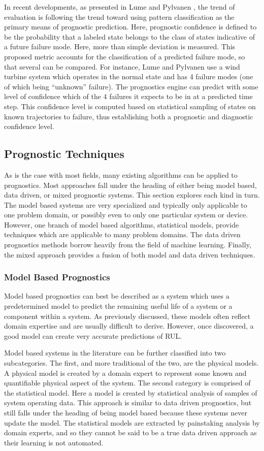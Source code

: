 \documentclass[12pt]{article}
\begin{document}
In recent developments, as presented in Lume and Pylvanen
\cite{6299510}, the trend of evaluation is following the trend toward
using pattern classification as the primary means of prognostic
prediction.  Here, prognostic confidence is defined to be the
probability that a labeled state belongs to the class of states
indicative of a future failure mode.  Here, more than simple deviation
is measured.  This proposed metric accounts for the classification of
a predicted failure mode, so that several can be compared.  For
instance, Lume and Pylvanen use a wind turbine system which operates
in the normal state and has 4 failure modes (one of which being
``unknown'' failure).  The prognostics engine can predict with some
level of confidence which of the 4 failures it expects to be in at a
predicted time step.  This confidence level is computed based on
statistical sampling of states on known trajectories to failure, thus
establishing both a prognostic and diagnostic confidence level.


\subsection{Prognostic Techniques}
As is the case with most fields, many existing algorithms can be
applied to prognostics.  Most approaches fall under the heading of
either being model based, data driven, or mixed prognostic systems.
This section explores each kind in turn. The model based systems are
very specialized and typically only applicable to one problem domain,
or possibly even to only one particular system or device.  However,
one branch of model based algorithms, statistical models, provide
techniques which are applicable to many problem domains.  The data
driven prognostics methods borrow heavily from the field of machine
learning.  Finally, the mixed approach provides a fusion of both model
and data driven techniques.

\subsubsection{Model Based Prognostics}
Model based prognostics can best be described as a system which uses a
predetermined model to predict the remaining useful life of a system
or a component within a system.  As previously discussed, these models
often reflect domain expertise and are usually difficult to derive.
However, once discovered, a good model can create very accurate
predictions of RUL.

Model based systems in the literature can be further classified into
two subcategories.  The first, and more traditional of the two, are
the physical models.  A physical model is created by a domain expert
to represent some known and quantifiable physical aspect of the
system. The second category is comprised of the statistical model.
Here a model is created by statistical analysis of samples of system
operating data.  This approach is similar to data driven prognostics,
but still falls under the heading of being model based because these
systems never update the model.  The statistical models are extracted
by painstaking analysis by domain experts, and so they cannot be said
to be a true data driven approach as their learning is not automated.
\end{document}
